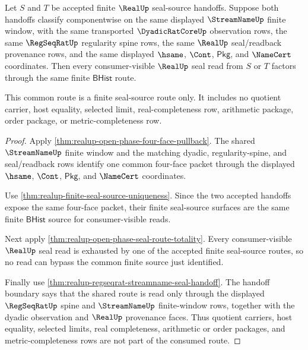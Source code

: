 \begin{theorem}
\label{thm:realup-four-face-common-window-seal-uniqueness}
Let $S$ and $T$ be accepted finite $\RealUp$ seal-source handoffs. Suppose both
handoffs classify componentwise on the same displayed $\StreamNameUp$ finite
window, with the same transported $\DyadicRatCoreUp$ observation rows, the same
$\RegSeqRatUp$ regularity spine rows, the same $\RealUp$ seal/readback
provenance rows, and the same displayed $\hsame$, $\Cont$, $\mathsf{Pkg}$, and
$\NameCert$ coordinates. Then every consumer-visible $\RealUp$ seal read from
$S$ or $T$ factors through the same finite $\mathsf{BHist}$ route.

This common route is a finite seal-source route only. It includes no quotient
carrier, host equality, selected limit, real-completeness row, arithmetic
package, order package, or metric-completeness row.
\end{theorem}
\begin{proof}
Apply \autoref{thm:realup-open-phase-four-face-pullback}. The shared
$\StreamNameUp$ finite window and the matching dyadic, regularity-spine, and
seal/readback rows identify one common four-face packet through the displayed
$\hsame$, $\Cont$, $\mathsf{Pkg}$, and $\NameCert$ coordinates.

Use \autoref{thm:realup-finite-seal-source-uniqueness}. Since the two accepted
handoffs expose the same four-face packet, their finite seal-source surfaces are
the same finite $\mathsf{BHist}$ source for consumer-visible reads.

Next apply \autoref{thm:realup-open-phase-seal-route-totality}. Every
consumer-visible $\RealUp$ seal read is exhausted by one of the accepted finite
seal-source routes, so no read can bypass the common finite source just
identified.

Finally use \autoref{thm:realup-regseqrat-streamname-seal-handoff}. The
handoff boundary says that the shared route is read only through the displayed
$\RegSeqRatUp$ spine and $\StreamNameUp$ finite-window rows, together with the
dyadic observation and $\RealUp$ provenance faces. Thus quotient carriers, host
equality, selected limits, real completeness, arithmetic or order packages, and
metric-completeness rows are not part of the consumed route.
\end{proof}

